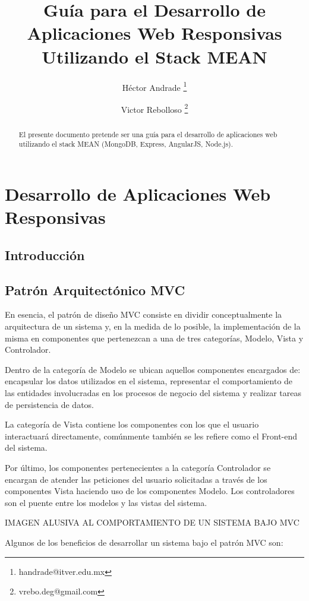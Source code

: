 \documentclass[10pt,a4paper]{report}
\title{Guía para el Desarrollo de Aplicaciones Web Responsivas Utilizando el Stack MEAN}
\author[1]{Héctor Andrade \thanks{handrade@itver.edu.mx}}
\author[1]{Victor Rebolloso \thanks{vrebo.deg@gmail.com}}
\affil[1]{Department of Computer Science, \LaTeX\ University}
\affil[2]{Department of Mechanical Engineering, \LaTeX\ University}
\begin{document}
\maketitle

\begin{abstract}
El presente documento pretende ser una guía para el desarrollo de aplicaciones web utilizando el stack MEAN (MongoDB, Express, AngularJS, Node.js).
\end{abstract}

\tableofcontents

\chapter{Desarrollo de Aplicaciones Web Responsivas}

\section{Introducción}

\section{Patrón Arquitectónico MVC}

En esencia, el patrón de diseño MVC consiste en dividir conceptualmente la arquitectura de un sistema y, en la medida de lo posible, la implementación de la misma en componentes que pertenezcan a una de tres categorías, Modelo, Vista y Controlador.

Dentro de la categoría de Modelo se ubican aquellos componentes encargados de: encapsular los datos utilizados en el sistema, representar el comportamiento de las entidades involucradas en los procesos de negocio del sistema y realizar tareas de persistencia de datos. 

La categoría de Vista contiene los componentes con los que el usuario interactuará directamente, comúnmente también se les refiere como el Front-end del sistema.

Por último, los componentes pertenecientes a la categoría Controlador se encargan de atender las peticiones del usuario solicitadas a través de los componentes Vista haciendo uso de los componentes Modelo. Los controladores son el puente entre los modelos y las vistas del sistema. 

IMAGEN ALUSIVA AL COMPORTAMIENTO DE UN SISTEMA BAJO MVC

Algunos de los beneficios de desarrollar un sistema bajo el patrón MVC son:
\end{document}

